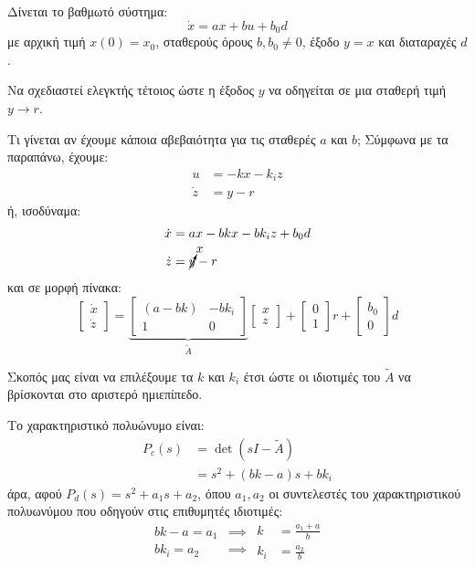 \documentclass[11pt,a4paper,notitlepage,fleqn]{article}
\begin{document}
\begin{exercise}
	Δίνεται το βαθμωτό σύστημα:\[
	\dot x = ax+bu+b_0d
	\]
	με αρχική τιμή \( x(0) = x_0 \), σταθερούς όρους \( b,b_0\neq 0 \),
	έξοδο \( y=x \) και διαταραχές \( d \).
	
	Να σχεδιαστεί ελεγκτής τέτοιος ώστε η έξοδος \( y \) να οδηγείται
	σε μια σταθερή τιμή \( y\to r \).
	
	Τι γίνεται αν έχουμε κάποια αβεβαιότητα για τις σταθερές
	\( a \) και \( b \);
	\tcblower
	Σύμφωνα με τα παραπάνω, έχουμε:
	\begin{align*}
		u &= -kx - k_i z\\
		\dot z &= y-r
	\end{align*}
	ή, ισοδύναμα:
	\begin{align*}
		\dot x &= ax - bkx - bk_i z + b_0 d \\
		\dot z &= \cancelto{x}{y}-r
	\end{align*}
	και σε μορφή πίνακα:
	\[
	\left[\begin{matrix}
	\dot x \\ \dot z
	\end{matrix}\right]
	= \underbrace{\left[\begin{matrix}
		(a-bk) & -bk_i \\ 1 & 0
		\end{matrix}\right]}_{\tilde A}\left[\begin{matrix}
	x \\ z
	\end{matrix}\right] + \left[\begin{matrix}
	0 \\ 1
	\end{matrix}\right]r + \left[\begin{matrix}
	b_0 \\ 0
	\end{matrix}\right]d
	\]
	
	Σκοπός μας είναι να επιλέξουμε τα \( k \) και \( k_i \) έτσι ώστε
	οι ιδιοτιμές του \( \tilde A \) να βρίσκονται στο αριστερό ημιεπίπεδο.
	
	Το χαρακτηριστικό πολυώνυμο είναι:
	\begin{align*}
	 P_c(s) &= \det(sI-\tilde A)
		\\ &= s^2 + (bk-a)s + bk_i
	\end{align*}
	άρα, αφού \( P_d(s) = s^2+a_1s+a_2 \), όπου \( a_1,a_2 \) οι
	συντελεστές του χαρακτηριστικού πολυωνύμου που οδηγούν
	στις επιθυμητές ιδιοτιμές:
	\[ \begin{aligned}
		bk-a = a_1 &\implies \\
		bk_i = a_2 &\implies
		\end{aligned}\boxed{\begin{aligned}
			k &= \frac{a_1+a}{b} \\
			k_i &= \frac{a_2}{b}
			\end{aligned}}
	\]
	

\end{exercise}
\end{document}
